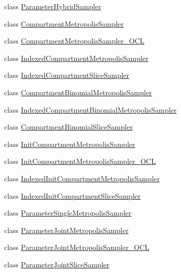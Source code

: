 \begin{DoxyCompactItemize}
\item 
class \hyperlink{classSpatialSEIR_1_1ParameterHybridSampler}{Parameter\-Hybrid\-Sampler}
\item 
class \hyperlink{classSpatialSEIR_1_1CompartmentMetropolisSampler}{Compartment\-Metropolis\-Sampler}
\item 
class \hyperlink{classSpatialSEIR_1_1CompartmentMetropolisSampler__OCL}{Compartment\-Metropolis\-Sampler\-\_\-\-O\-C\-L}
\item 
class \hyperlink{classSpatialSEIR_1_1IndexedCompartmentMetropolisSampler}{Indexed\-Compartment\-Metropolis\-Sampler}
\item 
class \hyperlink{classSpatialSEIR_1_1IndexedCompartmentSliceSampler}{Indexed\-Compartment\-Slice\-Sampler}
\item 
class \hyperlink{classSpatialSEIR_1_1CompartmentBinomialMetropolisSampler}{Compartment\-Binomial\-Metropolis\-Sampler}
\item 
class \hyperlink{classSpatialSEIR_1_1IndexedCompartmentBinomialMetropolisSampler}{Indexed\-Compartment\-Binomial\-Metropolis\-Sampler}
\item 
class \hyperlink{classSpatialSEIR_1_1CompartmentBinomialSliceSampler}{Compartment\-Binomial\-Slice\-Sampler}
\item 
class \hyperlink{classSpatialSEIR_1_1InitCompartmentMetropolisSampler}{Init\-Compartment\-Metropolis\-Sampler}
\item 
class \hyperlink{classSpatialSEIR_1_1InitCompartmentMetropolisSampler__OCL}{Init\-Compartment\-Metropolis\-Sampler\-\_\-\-O\-C\-L}
\item 
class \hyperlink{classSpatialSEIR_1_1IndexedInitCompartmentMetropolisSampler}{Indexed\-Init\-Compartment\-Metropolis\-Sampler}
\item 
class \hyperlink{classSpatialSEIR_1_1IndexedInitCompartmentSliceSampler}{Indexed\-Init\-Compartment\-Slice\-Sampler}
\item 
class \hyperlink{classSpatialSEIR_1_1ParameterSingleMetropolisSampler}{Parameter\-Single\-Metropolis\-Sampler}
\item 
class \hyperlink{classSpatialSEIR_1_1ParameterJointMetropolisSampler}{Parameter\-Joint\-Metropolis\-Sampler}
\item 
class \hyperlink{classSpatialSEIR_1_1ParameterJointMetropolisSampler__OCL}{Parameter\-Joint\-Metropolis\-Sampler\-\_\-\-O\-C\-L}
\item 
class \hyperlink{classSpatialSEIR_1_1ParameterJointSliceSampler}{Parameter\-Joint\-Slice\-Sampler}
\item 

\end{DoxyCompactItemize}
